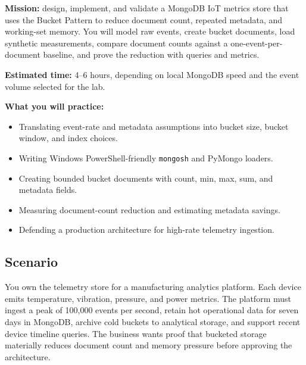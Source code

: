 \begin{capstonebox}
\textbf{Mission:} design, implement, and validate a MongoDB IoT metrics store that uses the Bucket Pattern to reduce document count, repeated metadata, and working-set memory. You will model raw events, create bucket documents, load synthetic measurements, compare document counts against a one-event-per-document baseline, and prove the reduction with queries and metrics.

\textbf{Estimated time:} 4--6 hours, depending on local MongoDB speed and the event volume selected for the lab.

\textbf{What you will practice:}
\begin{itemize}
    \item Translating event-rate and metadata assumptions into bucket size, bucket window, and index choices.
    \item Writing Windows PowerShell-friendly \texttt{mongosh} and PyMongo loaders.
    \item Creating bounded bucket documents with count, min, max, sum, and metadata fields.
    \item Measuring document-count reduction and estimating metadata savings.
    \item Defending a production architecture for high-rate telemetry ingestion.
\end{itemize}
\end{capstonebox}

\subsection*{Scenario}
You own the telemetry store for a manufacturing analytics platform. Each device emits temperature, vibration, pressure, and power metrics. The platform must ingest a peak of 100,000 events per second, retain hot operational data for seven days in MongoDB, archive cold buckets to analytical storage, and support recent device timeline queries. The business wants proof that bucketed storage materially reduces document count and memory pressure before approving the architecture.

